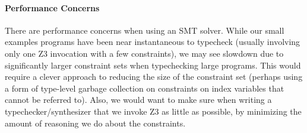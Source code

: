 \paragraph{Performance Concerns}
There are performance concerns when using an SMT solver.
While our small examples programs have been near instantaneous to typecheck (usually involving only one Z3 invocation with a few constraints), we may see slowdown due to significantly larger constraint sets when typechecking large \wasm programs.
This would require a clever approach to reducing the size of the constraint set (perhaps using a form of type-level garbage collection on constraints on index variables that cannot be referred to).
Also, we would want to make sure when writing a typechecker/synthesizer that we invoke Z3 as little as possible, by minimizing the amount of reasoning we do about the constraints.